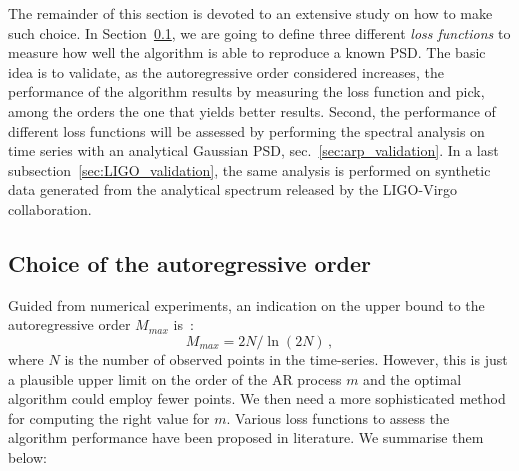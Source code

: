 \documentclass[twocolumn,showpacs,preprintnumbers,nofootinbib,prd,
superscriptaddress,10pt]{revtex4-1}
\begin{document}
The remainder of this section is devoted to an extensive study on how to make such choice.
In Section~\ref{sec:optimizers}, we are going to define three different \textit{loss functions} to measure how well the 
algorithm is able to reproduce a known PSD.
The basic idea is to validate, as the autoregressive order considered increases, the performance of the algorithm results 
by measuring the loss function and pick, among the orders the one that yields better results.
Second, the performance of different loss functions will be assessed by performing the spectral analysis on time series with an analytical Gaussian PSD, sec.~\ref{sec:arp_validation}.
In a last subsection~\ref{sec:LIGO_validation}, the same analysis is performed on synthetic data generated from the analytical spectrum released by the LIGO-Virgo collaboration.

\subsection{Choice of the autoregressive order}\label{sec:optimizers} 

Guided from numerical experiments, an indication on the upper bound to the autoregressive order $M_{max}$ is~\cite{doi:10.1190/1.1440902}:
\begin{equation}\label{eq:MMAx}
M_{max} = 2N / \ln{(2N)}\,,
\end{equation}
where $N$ is the number of observed points in the time-series.
However, this is just a plausible upper limit on the order of the AR process $m$ and the optimal algorithm could employ fewer points.
We then need a more sophisticated method for computing the right value for $m$.
Various loss functions to assess the algorithm performance have been proposed in literature.
We summarise them below:
\end{document}

